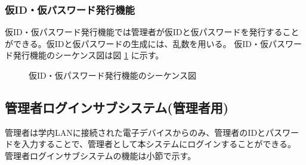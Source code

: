 \documentclass[a4j]{jarticle}
\begin{document}
  \subsubsection{仮ID・仮パスワード発行機能}
  仮ID・仮パスワード発行機能では管理者が仮IDと仮パスワードを発行することができる。仮IDと仮パスワードの生成には、乱数を用いる。 仮ID・仮パスワード発行機能のシーケンス図は図 \ref{fig:admin_user_id-pass.png} に示す。
  \begin{figure}[H]
    \centering
    \caption{仮ID・仮パスワード発行機能のシーケンス図}
    \label{fig:admin_user_id-pass.png}
  \end{figure}
  \subsection{管理者ログインサブシステム(管理者用)}
  管理者は学内LANに接続された電子デバイスからのみ、管理者のIDとパスワードを入力することで、管理者として本システムにログインすることができる。\\
  管理者ログインサブシステムの機能は小節で示す。
\end{document}
